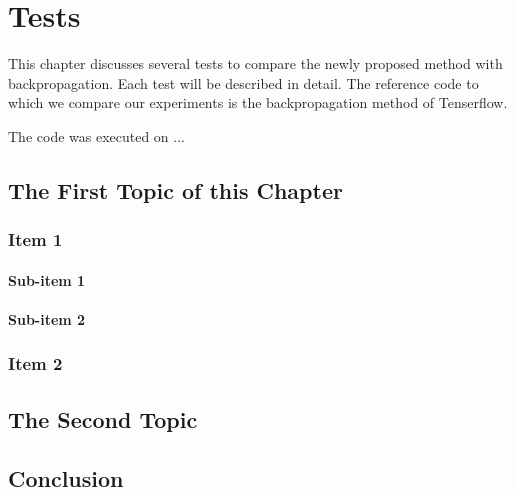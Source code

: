 \chapter{Tests}
\label{cha:3}
This chapter discusses several tests to compare the newly proposed method with backpropagation. Each test will be described in detail. The reference code to which we compare our experiments is the backpropagation method of Tenserflow.

The code was executed on ...


\section{The First Topic of this Chapter}
\subsection{Item 1}
\subsubsection{Sub-item 1}

\subsubsection{Sub-item 2}

\subsection{Item 2}

\section{The Second Topic}

\section{Conclusion}


